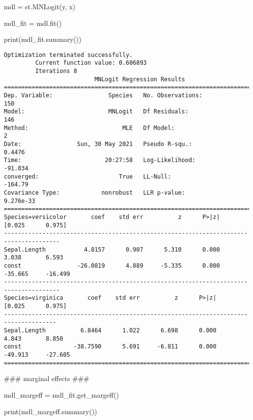 \documentclass[
  letterpaper,
  DIV=11,
  numbers=noendperiod]{scrreprt}
\newenvironment{Shaded}{\begin{snugshade}}{\end{snugshade}}
\newcommand{\AlertTok}[1]{\textcolor[rgb]{0.68,0.00,0.00}{#1}}
\newcommand{\BuiltInTok}[1]{\textcolor[rgb]{0.00,0.23,0.31}{#1}}
\newcommand{\CommentTok}[1]{\textcolor[rgb]{0.37,0.37,0.37}{#1}}
\newcommand{\NormalTok}[1]{\textcolor[rgb]{0.00,0.23,0.31}{#1}}
\newcommand{\OperatorTok}[1]{\textcolor[rgb]{0.37,0.37,0.37}{#1}}
\begin{document}
\begin{Shaded}
\begin{Highlighting}[]
\NormalTok{mdl }\OperatorTok{=}\NormalTok{ st.MNLogit(y, x)}
 
\NormalTok{mdl\_fit }\OperatorTok{=}\NormalTok{ mdl.fit()}

\BuiltInTok{print}\NormalTok{(mdl\_fit.summary())}
\end{Highlighting}
\end{Shaded}

\begin{verbatim}
Optimization terminated successfully.
         Current function value: 0.606893
         Iterations 8
                          MNLogit Regression Results                          
==============================================================================
Dep. Variable:                Species   No. Observations:                  150
Model:                        MNLogit   Df Residuals:                      146
Method:                           MLE   Df Model:                            2
Date:                Sun, 30 May 2021   Pseudo R-squ.:                  0.4476
Time:                        20:27:58   Log-Likelihood:                -91.034
converged:                       True   LL-Null:                       -164.79
Covariance Type:            nonrobust   LLR p-value:                 9.276e-33
=====================================================================================
Species=versicolor       coef    std err          z      P>|z|      [0.025      0.975]
--------------------------------------------------------------------------------------
Sepal.Length           4.8157      0.907      5.310      0.000       3.038       6.593
const                -26.0819      4.889     -5.335      0.000     -35.665     -16.499
--------------------------------------------------------------------------------------
Species=virginica       coef    std err          z      P>|z|      [0.025      0.975]
-------------------------------------------------------------------------------------
Sepal.Length          6.8464      1.022      6.698      0.000       4.843       8.850
const               -38.7590      5.691     -6.811      0.000     -49.913     -27.605
=====================================================================================
\end{verbatim}

\begin{Shaded}
\begin{Highlighting}[]
\CommentTok{\#\#\# marginal effects }\AlertTok{\#\#\#}
 
\NormalTok{mdl\_margeff }\OperatorTok{=}\NormalTok{ mdl\_fit.get\_margeff()}
 
\BuiltInTok{print}\NormalTok{(mdl\_margeff.summary())}
\end{Highlighting}
\end{Shaded}
\end{document}

